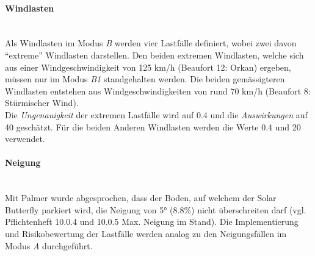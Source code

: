 \paragraph{Windlasten}\mbox{}\\
Als Windlasten im Modus \emph{B} werden vier Lastfälle definiert, wobei zwei davon ``extreme'' Windlasten darstellen. Den beiden extremen Windlasten, welche sich aus einer Windgeschwindigkeit von 125 km/h (Beaufort 12: Orkan) ergeben, müssen nur im Modus \emph{B1} standgehalten werden. Die beiden gemässigteren Windlasten entstehen aus Windgeschwindigkeiten von rund 70 km/h (Beaufort 8: Stürmischer Wind).\\
Die \emph{Ungenauigkeit} der extremen Lastfälle wird auf 0.4 und die \emph{Auswirkungen} auf 40 geschätzt. Für die beiden Anderen Windlasten werden die Werte 0.4 und 20 verwendet.
%

\paragraph{Neigung}\mbox{}\\
Mit Palmer wurde abgesprochen, dass der Boden, auf welchem der Solar Butterfly parkiert wird, die Neigung von 5° (8.8\%) nicht überschreiten darf (vgl. Pflichtenheft 10.0.4 und 10.0.5 Max. Neigung im Stand). Die Implementierung und Risikobewertung der Lastfälle werden analog zu den Neigungsfällen im Modus \emph{A} durchgeführt.

